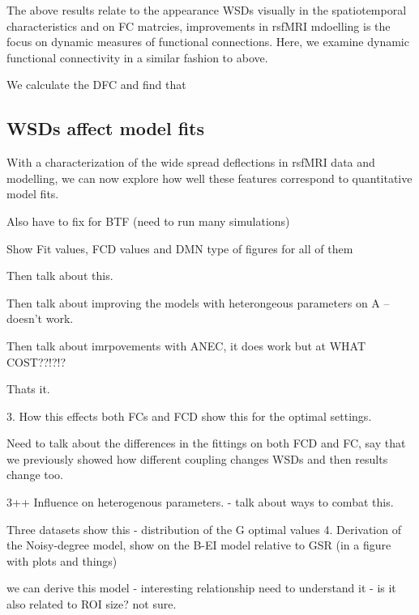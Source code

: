 \documentclass[oneside]{zHenriquesLab-StyleBioRxiv}
\begin{document}
The above results relate to the appearance WSDs visually in the spatiotemporal characteristics and on FC matrcies, improvements in rsfMRI mdoelling is the focus on dynamic measures of functional connections. Here, we examine dynamic functional connectivity in a similar fashion to above.

We calculate the DFC and find that






\subsection*{WSDs affect model fits}

With a characterization of the wide spread deflections in rsfMRI data and modelling, we can now explore how well these features correspond to quantitative model fits.



Also have to fix for BTF (need to run many simulations)

Show Fit values, FCD values and DMN type of figures for all of them

Then talk about this.

Then talk about improving the models with heterongeous parameters on A -- doesn't work.

Then talk about imrpovements with ANEC, it does work but at WHAT COST??!?!?

Thats it. 



3. How this effects both FCs and FCD show this for the optimal settings.

Need to talk about the differences in the fittings on both FCD and FC, say that we previously showed how different coupling changes WSDs and then results change too.


3++ Influence on heterogenous parameters. - talk about ways to combat this. 

Three datasets show this - distribution of the G optimal values
4. Derivation of the Noisy-degree model, show on the B-EI model relative to GSR (in a figure with plots and things)

we can derive this model - interesting relationship need to understand it - is it also related to ROI size? not sure.
\end{document}

